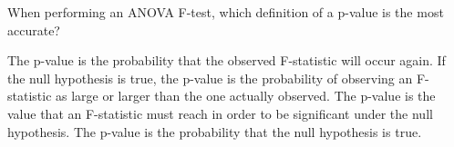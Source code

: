 \documentclass{article}
\begin{document}
\begin{mcquestions}
		\question When performing an ANOVA F-test, which definition of a p-value is the most accurate?
		\begin{mcanswerslist}
			\answer The p-value is the probability that the observed F-statistic will occur again.
			\answer[correct] If the null hypothesis is true, the p-value is the probability of observing an F-statistic as large or larger than the one actually observed.
			\answer The p-value is the value that an F-statistic must reach in order to be significant under the null hypothesis.
			\answer The p-value is the probability that the null hypothesis is true.
		\end{mcanswerslist}
	\end{mcquestions}
\end{document}
